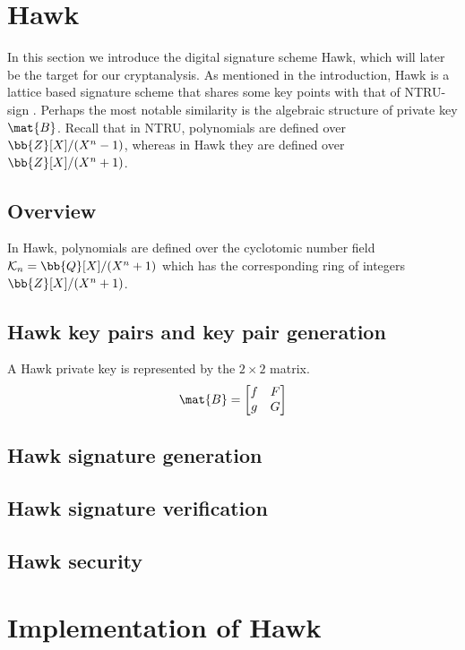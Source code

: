 \section{Hawk}
In this section we introduce the digital signature scheme Hawk, which will later be the target for our cryptanalysis.
As mentioned in the introduction, Hawk is a lattice based signature scheme that shares some key points with that of NTRU-sign \cite{HHPSW03}.
Perhaps the most notable similarity is the algebraic structure of private key $\mat{B}$. Recall that in NTRU, polynomials are defined 
over $\bb{Z}[X] / (X^n - 1)$, whereas in Hawk they are defined over $\bb{Z}[X] / (X^n + 1)$.
\subsection{Overview}
In Hawk, polynomials are defined over the cyclotomic number field $\mathcal{K}_n = \bb{Q}[X]/(X^n +1)$ which has the corresponding ring of integers
$\bb{Z}[X] / (X^n + 1)$.
\subsection{Hawk key pairs and key pair generation}
A Hawk private key is represented by the $2 \times 2$ matrix.
\[ \mat{B} = 
    \begin{bmatrix} 
        f & F \\
        g & G
    \end{bmatrix} 
\]
\subsection{Hawk signature generation}
\subsection{Hawk signature verification}
\subsection{Hawk security}
\section{Implementation of Hawk}
